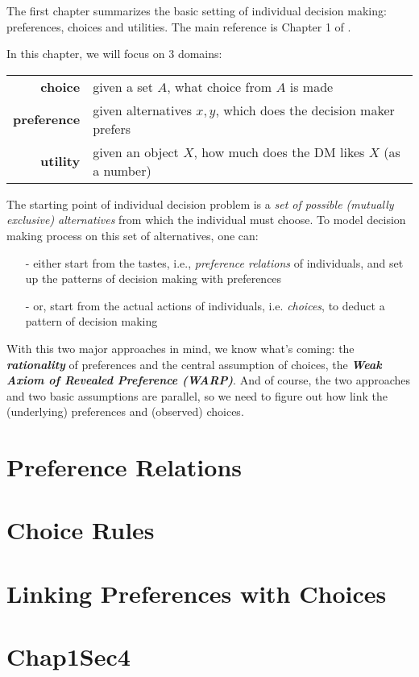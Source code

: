 \minitoc

\vspace{0.5cm}
The first chapter summarizes the basic setting of individual decision making: preferences, choices and utilities. The main reference is Chapter 1 of \citet{mas1995microeconomic}.

In this chapter, we will focus on 3 domains: 
\begin{center}
    \begin{tabular}{rl}
    \hline
    \textbf{choice} & given a set $A$, what choice from $A$ is made \\ 
    \textbf{preference} & given alternatives $x,y$, which does the decision maker prefers \\ 
    \textbf{utility} & given an object $X$, how much does the DM likes $X$ (as a number)\\
    \hline
    \end{tabular}
\end{center}

The starting point of individual decision problem is a \textit{set of possible (mutually exclusive) alternatives} from which the individual must choose. To model decision making process
on this set of alternatives, one can:
\begin{enumerate}
    \item[-] either start from the tastes, i.e., \textit{preference relations} of individuals, and set up the patterns of decision making with preferences
    \item[-] or, start from the actual actions of individuals, i.e. \textit{choices}, to deduct a pattern of decision making
\end{enumerate}

With this two major approaches in mind, we know what's coming: the \textit{\textbf{rationality}} of preferences and the central assumption of choices, the \textbf{\textit{Weak Axiom of Revealed Preference (WARP)}}.
And of course, the two approaches and two basic assumptions are parallel, so we need to figure out how link the (underlying) preferences and (observed) choices.

\section{Preference Relations}\label{chap1:sec1}


\section{Choice Rules}\label{chap1:sec2}


\section{Linking Preferences with Choices}\label{chap1:sec3}


\section{Chap1Sec4}\label{chap1:sec4}

